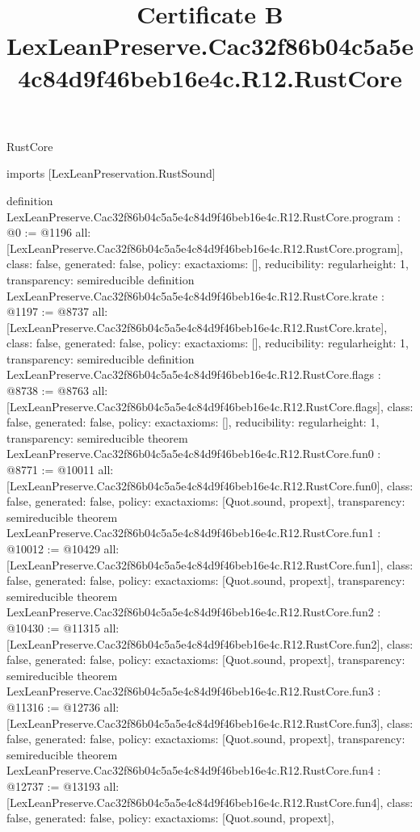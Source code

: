 \begin{lexlean}{RustCore}
\title{Certificate B LexLeanPreserve.Cac32f86b04c5a5e4c84d9f46beb16e4c.R12.RustCore}
\begin{coremodule}
imports [LexLeanPreservation.RustSound]

definition LexLeanPreserve.Cac32f86b04c5a5e4c84d9f46beb16e4c.R12.RustCore.program : @0 := @1196 {
  all: [LexLeanPreserve.Cac32f86b04c5a5e4c84d9f46beb16e4c.R12.RustCore.program],
  class: false,
  generated: false,
  policy: exact{axioms: []},
  reducibility: regular{height: 1},
  transparency: semireducible
}
definition LexLeanPreserve.Cac32f86b04c5a5e4c84d9f46beb16e4c.R12.RustCore.krate : @1197 := @8737 {
  all: [LexLeanPreserve.Cac32f86b04c5a5e4c84d9f46beb16e4c.R12.RustCore.krate],
  class: false,
  generated: false,
  policy: exact{axioms: []},
  reducibility: regular{height: 1},
  transparency: semireducible
}
definition LexLeanPreserve.Cac32f86b04c5a5e4c84d9f46beb16e4c.R12.RustCore.flags : @8738 := @8763 {
  all: [LexLeanPreserve.Cac32f86b04c5a5e4c84d9f46beb16e4c.R12.RustCore.flags],
  class: false,
  generated: false,
  policy: exact{axioms: []},
  reducibility: regular{height: 1},
  transparency: semireducible
}
theorem LexLeanPreserve.Cac32f86b04c5a5e4c84d9f46beb16e4c.R12.RustCore.fun0 : @8771 := @10011 {
  all: [LexLeanPreserve.Cac32f86b04c5a5e4c84d9f46beb16e4c.R12.RustCore.fun0],
  class: false,
  generated: false,
  policy: exact{axioms: [Quot.sound, propext]},
  transparency: semireducible
}
theorem LexLeanPreserve.Cac32f86b04c5a5e4c84d9f46beb16e4c.R12.RustCore.fun1 : @10012 := @10429 {
  all: [LexLeanPreserve.Cac32f86b04c5a5e4c84d9f46beb16e4c.R12.RustCore.fun1],
  class: false,
  generated: false,
  policy: exact{axioms: [Quot.sound, propext]},
  transparency: semireducible
}
theorem LexLeanPreserve.Cac32f86b04c5a5e4c84d9f46beb16e4c.R12.RustCore.fun2 : @10430 := @11315 {
  all: [LexLeanPreserve.Cac32f86b04c5a5e4c84d9f46beb16e4c.R12.RustCore.fun2],
  class: false,
  generated: false,
  policy: exact{axioms: [Quot.sound, propext]},
  transparency: semireducible
}
theorem LexLeanPreserve.Cac32f86b04c5a5e4c84d9f46beb16e4c.R12.RustCore.fun3 : @11316 := @12736 {
  all: [LexLeanPreserve.Cac32f86b04c5a5e4c84d9f46beb16e4c.R12.RustCore.fun3],
  class: false,
  generated: false,
  policy: exact{axioms: [Quot.sound, propext]},
  transparency: semireducible
}
theorem LexLeanPreserve.Cac32f86b04c5a5e4c84d9f46beb16e4c.R12.RustCore.fun4 : @12737 := @13193 {
  all: [LexLeanPreserve.Cac32f86b04c5a5e4c84d9f46beb16e4c.R12.RustCore.fun4],
  class: false,
  generated: false,
  policy: exact{axioms: [Quot.sound, propext]},
}
\end{coremodule}
\end{lexlean}
